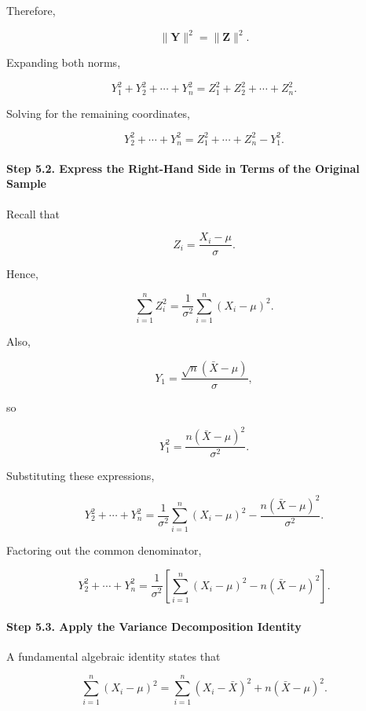 \documentclass[11pt]{article}
\begin{document}
\begin{mdframed}[
		linewidth=0.8pt,
		roundcorner=6pt,
		backgroundcolor=gray!5,
		linecolor=gray!60,
		innertopmargin=10pt,
		innerbottommargin=10pt,
		innerleftmargin=10pt,
		innerrightmargin=10pt
		]
		Therefore,
		
		\[
		\boxed{
			\|\mathbf Y\|^2
			=
			\|\mathbf Z\|^2.
		}
		\]
		
		Expanding both norms,
		
		\[
		Y_1^2+Y_2^2+\cdots+Y_n^2
		=
		Z_1^2+Z_2^2+\cdots+Z_n^2.
		\]
		
		Solving for the remaining coordinates,
		
		\[
		\boxed{
			Y_2^2+\cdots+Y_n^2
			=
			Z_1^2+\cdots+Z_n^2-Y_1^2.
		}
		\]
		
		\vspace{0.3cm}
		
		\paragraph{Step 5.2. Express the Right-Hand Side in Terms of the Original Sample}
		
		Recall that
		
		\[
		Z_i
		=
		\frac{X_i-\mu}{\sigma}.
		\]
		
		Hence,
		
		\[
		\sum_{i=1}^{n}Z_i^2
		=
		\frac1{\sigma^2}
		\sum_{i=1}^{n}(X_i-\mu)^2.
		\]
		
		Also,
		
		\[
		Y_1
		=
		\frac{\sqrt n(\bar X-\mu)}{\sigma},
		\]
		
		so
		
		\[
		Y_1^2
		=
		\frac{n(\bar X-\mu)^2}{\sigma^2}.
		\]
		
		Substituting these expressions,
		
		\[
		Y_2^2+\cdots+Y_n^2
		=
		\frac1{\sigma^2}
		\sum_{i=1}^{n}(X_i-\mu)^2
		-
		\frac{n(\bar X-\mu)^2}{\sigma^2}.
		\]
		
		Factoring out the common denominator,
		
		\[
		\boxed{
			Y_2^2+\cdots+Y_n^2
			=
			\frac1{\sigma^2}
			\left[
			\sum_{i=1}^{n}(X_i-\mu)^2
			-
			n(\bar X-\mu)^2
			\right].
		}
		\]
		
		\vspace{0.3cm}
		
		\paragraph{Step 5.3. Apply the Variance Decomposition Identity}
		
		A fundamental algebraic identity states that
		
		\[
		\boxed{
			\sum_{i=1}^{n}(X_i-\mu)^2
			=
			\sum_{i=1}^{n}(X_i-\bar X)^2
			+
			n(\bar X-\mu)^2.
		}
		\]
		

\end{mdframed}
\end{document}
